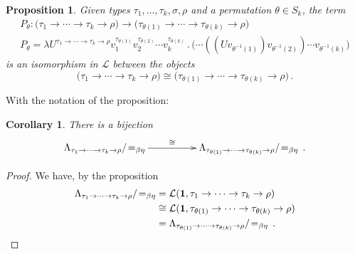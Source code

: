 \documentclass[english,letter paper,12pt,leqno]{article}
\def\ldot{\,.\,}
\def\typearrow{\Rightarrow}
\newcommand{\cat}[1]{\mathcal{#1}}
\newtheorem{proposition}[theorem]{Proposition}
\newtheorem{corollary}[theorem]{Corollary}
\theoremstyle{example}
\numberwithin{equation}{section}
\newcommand{\call}[1]{\mathcal{#1}}
\def\ldot{\,.\,}
\def\typearrow{\rightarrow}
\begin{document}
\begin{proposition} Given types $\tau_1,\ldots,\tau_k,\sigma,\rho$ and a permutation $\theta \in S_k$, the term
	\begin{gather*}
		P_\theta: \big( \tau_1 \typearrow \cdots \typearrow \tau_k \typearrow \rho \big) \typearrow \big( \tau_{\theta(1)} \typearrow \cdots \typearrow \tau_{\theta(k)} \typearrow \rho \big)\\
		P_\theta = \lambda U^{\tau_1 \typearrow \cdots \typearrow \tau_k \typearrow \rho} v_1^{\tau_{\theta(1)}}v_2^{\tau_{\theta(2)}} \cdots v_k^{\tau_{\theta(k)}} \ldot \big (\cdots((U v_{\theta^{-1}(1)} ) v_{\theta^{-1}(2)}) \cdots v_{\theta^{-1}(k)}\big)
	\end{gather*}
	is an isomorphism in $\cat{L}$ between the objects
	\[
	\big( \tau_1 \typearrow \cdots \typearrow \tau_k \typearrow \rho \big) \cong \big( \tau_{\theta(1)} \typearrow \cdots \typearrow \tau_{\theta(k)} \typearrow \rho \big)\,.
	\]
\end{proposition}
With the notation of the proposition:
\begin{corollary}\label{cor:perm} There is a bijection
	\[
	\xymatrix@C+2pc{
		\Lambda_{\tau_1 \typearrow \cdots \typearrow \tau_k \typearrow \rho} /\!=_{\beta\eta} \ar[r]^-{\cong} & \Lambda_{\tau_{\theta(1)} \typearrow \cdots \typearrow \tau_{\theta(k)} \typearrow \rho} /\!=_{\beta\eta}\,.
	}
	\]
\end{corollary}
\begin{proof}
	We have, by the proposition
	\begin{align*}
		\Lambda_{\tau_1 \typearrow \cdots \typearrow \tau_k \typearrow \rho} /\!=_{\beta\eta} &= \call{L}(\bold{1}, \tau_1 \typearrow \cdots \typearrow \tau_k \typearrow \rho)\\
		&\cong \cat{L}(\bold{1}, \tau_{\theta(1)} \typearrow \cdots \typearrow \tau_{\theta(k)} \typearrow \rho)\\
		&= \Lambda_{\tau_{\theta(1)} \typearrow \cdots \typearrow \tau_{\theta(k)} \typearrow \rho} /\!=_{\beta\eta}\,.
	\end{align*}
\end{proof}
\end{document}
